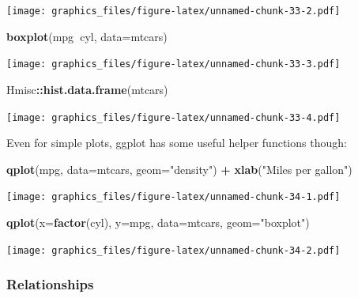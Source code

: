 \documentclass[]{article}
\newenvironment{Shaded}{\begin{snugshade}}{\end{snugshade}}
\newcommand{\KeywordTok}[1]{\textcolor[rgb]{0.13,0.29,0.53}{\textbf{#1}}}
\newcommand{\DataTypeTok}[1]{\textcolor[rgb]{0.13,0.29,0.53}{#1}}
\newcommand{\StringTok}[1]{\textcolor[rgb]{0.31,0.60,0.02}{#1}}
\newcommand{\OperatorTok}[1]{\textcolor[rgb]{0.81,0.36,0.00}{\textbf{#1}}}
\newcommand{\NormalTok}[1]{#1}
\theoremstyle{definition}
\theoremstyle{definition}
\theoremstyle{definition}
\theoremstyle{remark}
\begin{document}
\texttt{[image: graphics\_files/figure-latex/unnamed-chunk-33-2.pdf]}

\begin{Shaded}
\begin{Highlighting}[]
\KeywordTok{boxplot}\NormalTok{(mpg}\OperatorTok{~}\NormalTok{cyl, }\DataTypeTok{data=}\NormalTok{mtcars)}
\end{Highlighting}
\end{Shaded}

\texttt{[image: graphics\_files/figure-latex/unnamed-chunk-33-3.pdf]}

\begin{Shaded}
\begin{Highlighting}[]
\NormalTok{Hmisc}\OperatorTok{::}\KeywordTok{hist.data.frame}\NormalTok{(mtcars)}
\end{Highlighting}
\end{Shaded}

\texttt{[image: graphics\_files/figure-latex/unnamed-chunk-33-4.pdf]}

Even for simple plots, ggplot has some useful helper functions though:

\begin{Shaded}
\begin{Highlighting}[]
\KeywordTok{qplot}\NormalTok{(mpg, }\DataTypeTok{data=}\NormalTok{mtcars, }\DataTypeTok{geom=}\StringTok{"density"}\NormalTok{) }\OperatorTok{+}\StringTok{ }\KeywordTok{xlab}\NormalTok{(}\StringTok{"Miles per gallon"}\NormalTok{)}
\end{Highlighting}
\end{Shaded}

\texttt{[image: graphics\_files/figure-latex/unnamed-chunk-34-1.pdf]}

\begin{Shaded}
\begin{Highlighting}[]
\KeywordTok{qplot}\NormalTok{(}\DataTypeTok{x=}\KeywordTok{factor}\NormalTok{(cyl), }\DataTypeTok{y=}\NormalTok{mpg, }\DataTypeTok{data=}\NormalTok{mtcars, }\DataTypeTok{geom=}\StringTok{"boxplot"}\NormalTok{) }
\end{Highlighting}
\end{Shaded}

\texttt{[image: graphics\_files/figure-latex/unnamed-chunk-34-2.pdf]}

\subsubsection{Relationships}\label{relationships-1}
\end{document}
